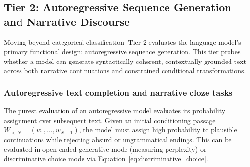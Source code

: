 \documentclass[../../../main.tex]{subfiles}
\begin{document}
\subsection{Tier 2: Autoregressive Sequence Generation and Narrative Discourse}
\label{subsec:tier2_generation_discourse}

Moving beyond categorical classification, Tier 2 evaluates the language model's primary functional design: autoregressive sequence generation. This tier probes whether a model can generate syntactically coherent, contextually grounded text across both narrative continuations and constrained conditional transformations.

\subsubsection{Autoregressive text completion and narrative cloze tasks}
\label{subsec:text_completion_cloze}
The purest evaluation of an autoregressive model evaluates its probability assignment over subsequent text. Given an initial conditioning passage $W_{<N} = (w_1, \dots, w_{N-1})$, the model must assign high probability to plausible continuations while rejecting absurd or ungrammatical endings. This can be evaluated in open-ended generative mode (measuring perplexity) or discriminative choice mode via Equation~\eqref{eq:discriminative_choice}.
\end{document}
